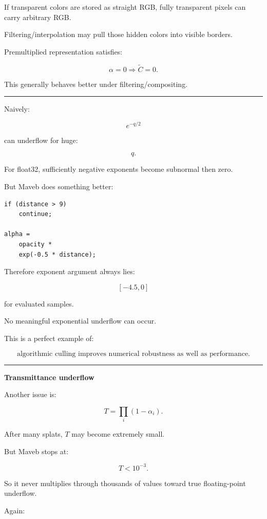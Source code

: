 If transparent colors are stored as straight RGB, fully transparent pixels can carry arbitrary RGB.

Filtering/interpolation may pull those hidden colors into visible borders.

Premultiplied representation satisfies:

\[
\alpha=0
\Rightarrow
\tilde C=0.
\]

This generally behaves better under filtering/compositing.

\begin{center}\rule{0.5\linewidth}{0.5pt}\end{center}

Naively:

\[
e^{-q/2}
\]

can underflow for huge:

\[
q.
\]

For float32, sufficiently negative exponents become subnormal then zero.

But Maveb does something better:

\begin{verbatim}
if (distance > 9)
    continue;

alpha =
    opacity *
    exp(-0.5 * distance);
\end{verbatim}

Therefore exponent argument always lies:

\[
[-4.5,0]
\]

for evaluated samples.

No meaningful exponential underflow can occur.

This is a perfect example of:

\[
\boxed{
\text{algorithmic culling improves numerical robustness as well as performance}.
}
\]

\begin{center}\rule{0.5\linewidth}{0.5pt}\end{center}

\textbf{Transmittance underflow}

Another issue is:

\[
T=
\prod_i(1-\alpha_i).
\]

After many splats, \(T\) may become extremely small.

But Maveb stops at:

\[
T<10^{-3}.
\]

So it never multiplies through thousands of values toward true floating-point underflow.

Again:

